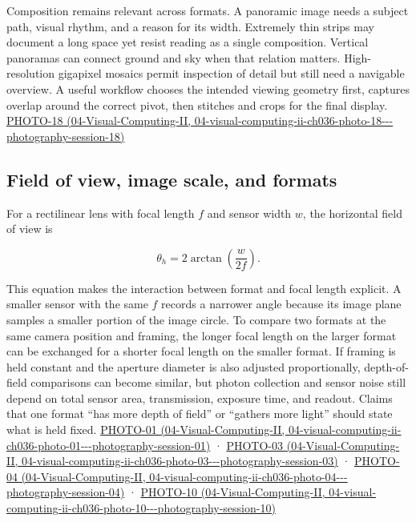 Composition remains relevant across formats. A panoramic image needs a subject path, visual rhythm, and a reason for its width. Extremely thin strips may document a long space yet resist reading as a single composition. Vertical panoramas can connect ground and sky when that relation matters. High-resolution gigapixel mosaics permit inspection of detail but still need a navigable overview. A useful workflow chooses the intended viewing geometry first, captures overlap around the correct pivot, then stitches and crops for the final display. \href{../04-Visual-Computing-II/main.pdf\#nameddest=04-visual-computing-ii-ch036-photo-18---photography-session-18}{PHOTO-18 (04-Visual-Computing-II, 04-visual-computing-ii-ch036-photo-18-\/-\/-photography-session-18)}

\subsection{Field of view, image scale, and formats}\label{03-visual-computing-i-ch003-field-of-view-image-scale-and-formats}

For a rectilinear lens with focal length \(f\) and sensor width \(w\), the horizontal field of view is

\[
\theta_h=2\arctan\left(\frac{w}{2f}\right).
\]

This equation makes the interaction between format and focal length explicit. A smaller sensor with the same \(f\) records a narrower angle because its image plane samples a smaller portion of the image circle. To compare two formats at the same camera position and framing, the longer focal length on the larger format can be exchanged for a shorter focal length on the smaller format. If framing is held constant and the aperture diameter is also adjusted proportionally, depth-of-field comparisons can become similar, but photon collection and sensor noise still depend on total sensor area, transmission, exposure time, and readout. Claims that one format ``has more depth of field'' or ``gathers more light'' should state what is held fixed. \href{../04-Visual-Computing-II/main.pdf\#nameddest=04-visual-computing-ii-ch036-photo-01---photography-session-01}{PHOTO-01 (04-Visual-Computing-II, 04-visual-computing-ii-ch036-photo-01-\/-\/-photography-session-01)} · \href{../04-Visual-Computing-II/main.pdf\#nameddest=04-visual-computing-ii-ch036-photo-03---photography-session-03}{PHOTO-03 (04-Visual-Computing-II, 04-visual-computing-ii-ch036-photo-03-\/-\/-photography-session-03)} · \href{../04-Visual-Computing-II/main.pdf\#nameddest=04-visual-computing-ii-ch036-photo-04---photography-session-04}{PHOTO-04 (04-Visual-Computing-II, 04-visual-computing-ii-ch036-photo-04-\/-\/-photography-session-04)} · \href{../04-Visual-Computing-II/main.pdf\#nameddest=04-visual-computing-ii-ch036-photo-10---photography-session-10}{PHOTO-10 (04-Visual-Computing-II, 04-visual-computing-ii-ch036-photo-10-\/-\/-photography-session-10)}


